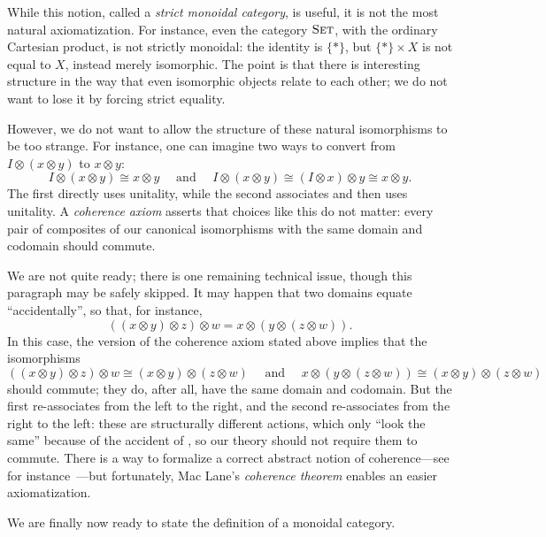 While this notion, called a \emph{strict monoidal category}, is useful, it is
not the most natural axiomatization. For instance, even the category
${\textsc{\text{Set}}}$, with the ordinary Cartesian product, is not strictly monoidal: the
identity is $\{*\}$, but $\{*\}\times X$ is not equal to $X$, instead merely
isomorphic. The point is that there is interesting structure in the way that
even isomorphic objects relate to each other; we do not want to lose it by
forcing strict equality.

However, we do not want to allow the structure of these natural isomorphisms to
be too strange. For instance, one can imagine two ways to convert from $I\otimes (x\otimes y)$
to $x\otimes y$: \[
  I\otimes(x\otimes y) \cong x\otimes y \quad\text{ and }\quad
  I\otimes(x\otimes y) \cong (I\otimes x)\otimes y \cong x\otimes y.
\]The first directly uses unitality, while the second associates and then uses
unitality. A \emph{coherence axiom} asserts that choices like this do not
matter: every pair of composites of our canonical isomorphisms with the same
domain and codomain should commute.

We are not quite ready; there is one remaining technical issue, though this
paragraph may be safely skipped. It may happen that two
domains equate ``accidentally'', so that, for instance,
\begin{equation}\label{eqn:accidental equality}
  ((x\otimes y)\otimes z)\otimes w = x\otimes(y\otimes(z\otimes w)).
\end{equation}
In this case, the version of the coherence axiom stated above implies that the
isomorphisms \[
  ((x\otimes y)\otimes z)\otimes w \cong (x\otimes y)\otimes (z\otimes w)
  \quad\text{ and }\quad
  x\otimes(y\otimes(z\otimes w)) \cong (x\otimes y)\otimes (z\otimes w)
\] should commute; they do, after all, have the same domain and codomain. But
the first re-associates from the left to the right, and the second re-associates
from the right to the left: these are structurally different actions, which only
``look the same'' because of the accident of ,
so our theory should not require them to commute. There is a way to formalize
a correct abstract notion of coherence---see for instance~\cite[subsection
VII.2]{maclane-1971}---but fortunately, Mac Lane's \emph{coherence theorem}
enables an easier axiomatization.

We are finally now ready to state the definition of a monoidal category.

